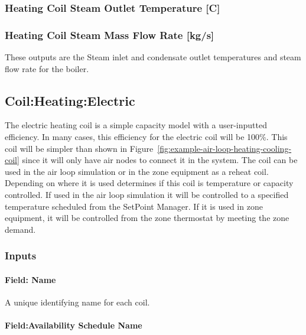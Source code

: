 \subsubsection{Heating Coil Steam Outlet Temperature {[}C{]}}\label{heating-coil-steam-outlet-temperature-c}

\subsubsection{Heating Coil Steam Mass Flow Rate {[}kg/s{]}}\label{heating-coil-steam-mass-flow-rate-kgs}

These outputs are the Steam inlet and condensate outlet temperatures and steam flow rate for the boiler.

\subsection{Coil:Heating:Electric}\label{coilheatingelectric}

The electric heating coil is a simple capacity model with a user-inputted efficiency. In many cases, this efficiency for the electric coil will be 100\%. This coil will be simpler than shown in Figure~\ref{fig:example-air-loop-heating-cooling-coil} since it will only have air nodes to connect it in the system. The coil can be used in the air loop simulation or in the zone equipment as a reheat coil. Depending on where it is used determines if this coil is temperature or capacity controlled. If used in the air loop simulation it will be controlled to a specified temperature scheduled from the SetPoint Manager. If it is used in zone equipment, it will be controlled from the zone thermostat by meeting the zone demand.

\subsubsection{Inputs}\label{inputs-3-017}

\paragraph{Field: Name}\label{field-name-3-015}

A unique identifying name for each coil.

\paragraph{Field:Availability Schedule Name}\label{fieldavailability-schedule-name-3}

